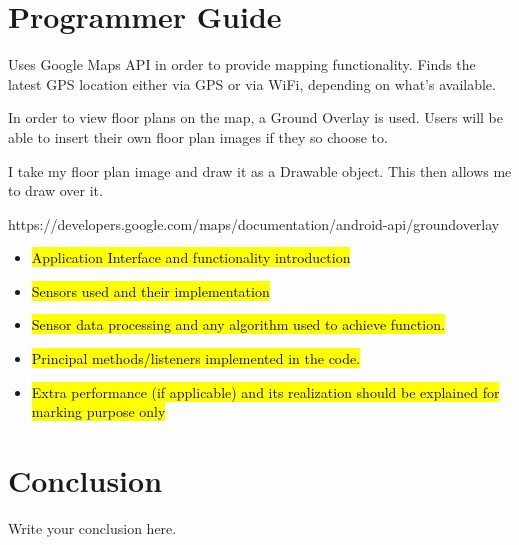 \documentclass[twocolumn]{article}
\begin{document}
\section*{Programmer Guide}

Uses Google Maps API in order to provide mapping functionality. Finds the latest GPS location either via GPS or via WiFi, depending on what's available. 

In order to view floor plans on the map, a Ground Overlay is used. Users will be able to insert their own floor plan images if they so choose to.


I take my floor plan image and draw it as a Drawable object. This then allows me to draw over it. 


https://developers.google.com/maps/documentation/android-api/groundoverlay

\begin{itemize}

\item \hl{Application Interface and functionality introduction}
\item \hl{ Sensors used and their implementation }
\item \hl{ Sensor data processing and any algorithm used to achieve function. }
\item \hl{ Principal methods/listeners implemented in the code. }
\item \hl{Extra performance (if applicable) and its realization should be explained for marking purpose only}
\end{itemize}


\section*{Conclusion}
Write your conclusion here.



\end{document}

